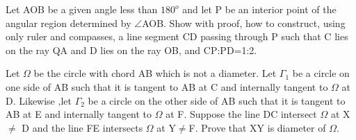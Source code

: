 \item Let AOB be a given angle less than $180^{o}$ and let P be an interior point of the angular region determined by 
$\angle$AOB. Show with proof, how to construct, using only ruler and compasses, a line segment CD passing through P such that C lies on the ray QA and D lies on the ray OB, and CP:PD=1:2.

\item Let $\Omega$ be the circle with chord AB which is not a diameter. Let $\Gamma_1$ be a circle on one side of AB such that it is tangent to AB at C and internally tangent to $\Omega$ at D. Likewise ,let $\Gamma_2$ be a circle on the other side of AB such that it is tangent to AB at E and internally tangent to $\Omega$ at F. Suppose the line DC intersect 
$\Omega$ at X $\neq$ D and the line FE intersects $\Omega$ at Y$\neq$F. Prove that XY is diameter of $\Omega$.
